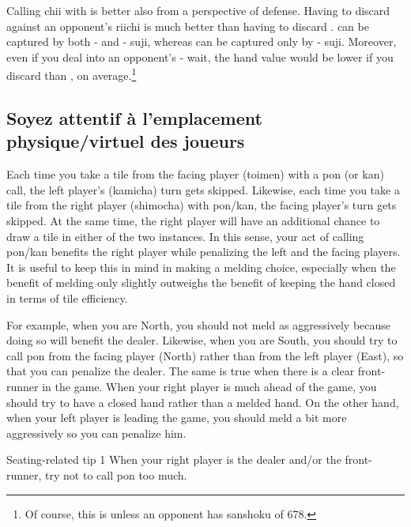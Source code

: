 \bigskip
Calling {\jap chii} with {\LARGE{}} is better also from a perspective of defense. Having to discard {\LARGE{}} against an opponent's riichi is much better than having to discard {\LARGE{}}. {\LARGE{}} can be captured by both {\LARGE{}-} and {\LARGE{}-} {\jap suji}, whereas {\LARGE{}} can be captured only by {\LARGE{}-} {\jap suji}. Moreover, even if you deal into an opponent's {\LARGE{}-} wait, the hand value would be lower if you discard {\LARGE{}} than {\LARGE{}}, on average.\footnote{Of course, this is unless an opponent has {\jap sanshoku} of 678.} 


\subsection{Soyez attentif à l’emplacement physique/virtuel des joueurs}
Each time you take a tile from the facing player ({\jap toimen}) with a {\jap pon} (or {\jap kan}) call, the left player's ({\jap kamicha}) turn gets skipped. Likewise, each time you take a tile from the right player ({\jap shimocha}) with {\jap pon/kan}, the facing player's turn gets skipped. At the same time, the right player will have an additional chance to draw a tile in either of the two instances. In this sense, your act of calling {\jap pon/kan} benefits the right player while penalizing the left and the facing players. 
It is useful to keep this in mind in making a melding choice, especially when the benefit of melding only slightly outweighs the benefit of keeping the hand closed in terms of tile efficiency.

\bigskip
For example, when you are North, you should not meld as aggressively because doing so will benefit the dealer. Likewise, when you are South, you should try to call {\jap pon} from the facing player (North) rather than from the left player (East), so that you can penalize the dealer. 
The same is true when there is a clear front-runner in the game. When your right player is much ahead of the game, you should try to have a closed hand rather than a melded hand. On the other hand, when your left player is leading the game, you should meld a bit more aggressively so you can penalize him. 

\begin{itembox}[c]{Seating-related tip 1}
When your right player is the dealer and/or the front-runner, try not to call {\jap pon} too much. 
\end{itembox}

